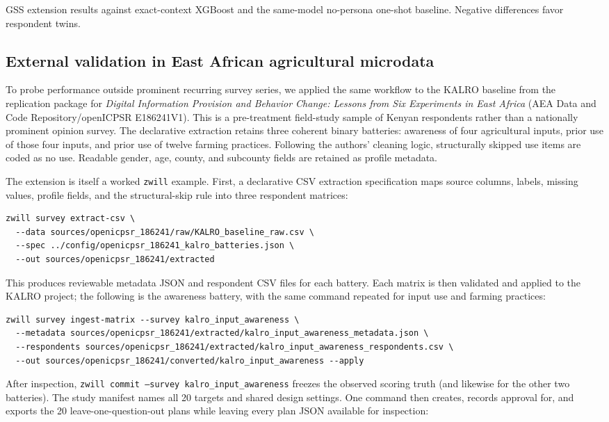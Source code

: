 \documentclass[11pt]{article}
\newcommand{\zwill}{\texttt{zwill}}
\begin{document}
\begin{table}[ht]
\centering
\scriptsize
\resizebox{\textwidth}{!}{}
\caption{GSS extension results against exact-context XGBoost and the same-model
no-persona one-shot baseline. Negative differences favor respondent twins.}
\label{tab:gss-extension}
\end{table}

\subsection{External validation in East African agricultural microdata}
To probe performance outside prominent recurring survey series, we applied the
same workflow to the KALRO baseline from the replication package for
\emph{Digital Information Provision and Behavior Change: Lessons from Six
Experiments in East Africa} (AEA Data and Code Repository/openICPSR
E186241V1). This is a pre-treatment field-study sample of
\KALRORespondents{} Kenyan respondents rather than a nationally prominent
opinion survey. The declarative extraction retains three coherent binary
batteries: awareness of four agricultural inputs, prior use of those four
inputs, and prior use of twelve farming practices. Following the authors'
cleaning logic, structurally skipped use items are coded as no use. Readable
gender, age, county, and subcounty fields are retained as profile metadata.

The extension is itself a worked \zwill{} example. First, a declarative CSV
extraction specification maps source columns, labels, missing values, profile
fields, and the structural-skip rule into three respondent matrices:

\begin{lstlisting}[style=shell]
zwill survey extract-csv \
  --data sources/openicpsr_186241/raw/KALRO_baseline_raw.csv \
  --spec ../config/openicpsr_186241_kalro_batteries.json \
  --out sources/openicpsr_186241/extracted
\end{lstlisting}
This produces reviewable metadata JSON and respondent CSV files for each
battery. Each matrix is then validated and applied to the KALRO project; the
following is the awareness battery, with the same command repeated for input
use and farming practices:

\begin{lstlisting}[style=shell]
zwill survey ingest-matrix --survey kalro_input_awareness \
  --metadata sources/openicpsr_186241/extracted/kalro_input_awareness_metadata.json \
  --respondents sources/openicpsr_186241/extracted/kalro_input_awareness_respondents.csv \
  --out sources/openicpsr_186241/converted/kalro_input_awareness --apply
\end{lstlisting}
After inspection, \texttt{zwill commit --survey kalro\_input\_awareness}
freezes the observed scoring truth (and likewise for the other two batteries).
The study manifest names all 20 targets and shared design settings. One command
then creates, records approval for, and exports the 20 leave-one-question-out
plans while leaving every plan JSON available for inspection:
\end{document}
